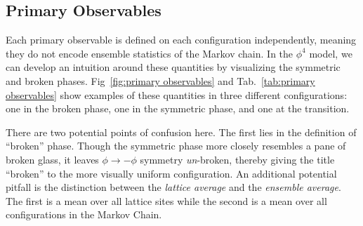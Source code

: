 \subsection{Primary Observables}
\label{sec:primary observables}
Each primary observable is defined on each configuration independently, meaning they do not encode ensemble statistics of the Markov chain. In the $\phi^4$ model, we can develop an intuition around these quantities by visualizing the symmetric and broken phases. Fig~\ref{fig:primary observables} and Tab.~\ref{tab:primary observables} show examples of these quantities in three different configurations: one in the broken phase, one in the symmetric phase, and one at the transition. 

There are two potential points of confusion here. The first lies in the definition of ``broken'' phase. Though the symmetric phase more closely resembles a pane of broken glass, it leaves $\phi\rightarrow-\phi$ symmetry \textit{un}-broken, thereby giving the title ``broken'' to the more visually uniform configuration. An additional potential pitfall is the distinction between the \textit{lattice average} and the \textit{ensemble average}. The first is a mean over all lattice sites while the second is a mean over all configurations in the Markov Chain.

